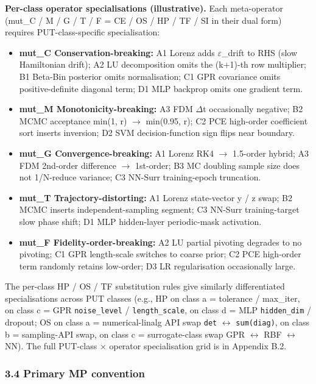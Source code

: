 \documentclass[review,12pt,authoryear]{elsarticle}
\providecommand{\tightlist}{\setlength{\itemsep}{0pt}\setlength{\parskip}{0pt}}
\begin{document}
\textbf{Per-class operator specialisations (illustrative).} Each
meta-operator (mut\_C / M / G / T / F = CE / OS / HP / TF / SI in their
dual form) requires PUT-class-specific specialisation:

\begin{itemize}
\tightlist
\item
  \textbf{mut\_C Conservation-breaking:} A1 Lorenz adds $\varepsilon$\_drift to RHS
  (slow Hamiltonian drift); A2 LU decomposition omits the (k+1)-th row
  multiplier; B1 Beta-Bin posterior omits normalisation; C1 GPR
  covariance omits positive-definite diagonal term; D1 MLP backprop
  omits one gradient term.
\item
  \textbf{mut\_M Monotonicity-breaking:} A3 FDM $\Delta$t occasionally
  negative; B2 MCMC acceptance min(1, r) $\to$ min(0.95, r); C2 PCE
  high-order coefficient sort inserts inversion; D2 SVM
  decision-function sign flips near boundary.
\item
  \textbf{mut\_G Convergence-breaking:} A1 Lorenz RK4 $\to$ 1.5-order
  hybrid; A3 FDM 2nd-order difference $\to$ 1st-order; B3 MC doubling sample
  size does not 1/N-reduce variance; C3 NN-Surr training-epoch
  truncation.
\item
  \textbf{mut\_T Trajectory-distorting:} A1 Lorenz state-vector y / z
  swap; B2 MCMC inserts independent-sampling segment; C3 NN-Surr
  training-target slow phase shift; D1 MLP hidden-layer periodic-mask
  activation.
\item
  \textbf{mut\_F Fidelity-order-breaking:} A2 LU partial pivoting
  degrades to no pivoting; C1 GPR length-scale switches to coarse prior;
  C2 PCE high-order term randomly retains low-order; D3 LR
  regularisation occasionally large.
\end{itemize}

The per-class HP / OS / TF substitution rules give similarly
differentiated specialisations across PUT classes (e.g., HP on class a =
tolerance / max\_iter, on class c = GPR \texttt{noise\_level} /
\texttt{length\_scale}, on class d = MLP \texttt{hidden\_dim} / dropout;
OS on class a = numerical-linalg API swap \texttt{det} $\leftrightarrow$
\texttt{sum(diag)}, on class b = sampling-API swap, on class c =
surrogate-class swap GPR $\leftrightarrow$ RBF $\leftrightarrow$ NN). The full PUT-class $\times$ operator
specialisation grid is in Appendix B.2.

\subsubsection{3.4 Primary MP convention}\label{primary-mp-convention}
\end{document}
